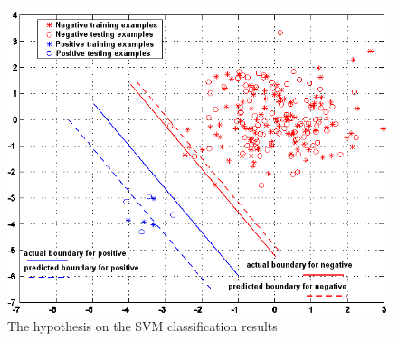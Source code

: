 \begin{figure}
\begin{center}
 \includegraphics[scale=0.5]{ch4/figures/SVMresult.png}
\caption{The hypothesis on the SVM classification results}
\label{fig:hypothesisSVM}
\end{center}
\end{figure} 
